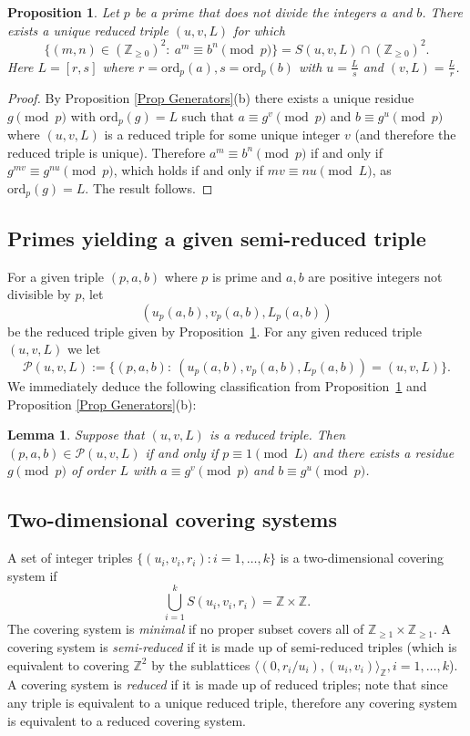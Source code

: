 \documentclass[12pt, a4paper,  reqno, english]{amsart}%
\numberwithin{equation}{section}
\newcommand{\Z}{\mathbb{Z}}
\newtheorem{proposition}{Proposition}
\newtheorem{lemma}{Lemma}
\theoremstyle{definition}
\renewcommand{\geq}{\geqslant}
\begin{document}
 \begin{proposition} \label{Prop 1} Let $p$ be a prime that does not divide the integers $a$ and $b$.
There exists a unique reduced triple $(u,v,L)$ for which 
\[
  \{ (m,n)\in  (\mathbb Z_{\ge0})^2:\ a^m\equiv b^n \pmod p\} = S(u,v,L)\cap (\mathbb Z_{\ge0})^2.
  \]
Here $L=[r,s]$ where   $r=\text{ord}_p(a), s=\text{ord}_p(b)$  with  $u=\frac Ls$ and $(v,L)=\frac Lr$.
\end{proposition}  

\begin{proof} By Proposition \ref{Prop Generators}(b) there exists a unique residue $g\pmod p$ with $\text{ord}_p(g)=L$  such that $a\equiv g^{v} \pmod p$ and $b\equiv g^{u} \pmod p$ where $(u,v,L)$ is a    reduced triple for some unique integer $v$ (and therefore the reduced triple is unique).  Therefore $a^m\equiv b^n \pmod p$ if and only if $g^{mv}\equiv g^{nu} \pmod p$, which holds if and only if
$mv\equiv nu \pmod L$, as $\text{ord}_p(g)=L$.  The result follows.
\end{proof}
 

 
 
   
 
  \subsection{Primes yielding a given semi-reduced triple}
For a given triple $(p,a,b)$ where $p$ is prime and $a, b$ are positive integers not divisible by $p$, let
$$
(u_p(a,b), v_p(a,b), L_p(a,b))
$$ 
be the reduced triple given by Proposition~\ref{Prop 1}. 
For any given reduced triple $(u,v,L)$ we let 
\[
\mathcal P(u,v,L):=\bigg\{ (p,a,b) :\ (u_p(a,b), v_p(a,b), L_p(a,b))= (u,v,L)\bigg\}.
\]
We immediately deduce the following classification from Proposition~\ref{Prop 1} and Proposition \ref{Prop Generators}(b):

  \begin{lemma} \label{lem: create} Suppose that $(u,v,L)$ is a reduced triple. Then
 $(p,a,b)\in \mathcal P(u,v,L)$ if and only if $p\equiv 1 \pmod L$ and there exists a residue $g \pmod p$ of order $L$
 with  $a\equiv g^v \pmod p$ and $b\equiv g^u \pmod p$.
\end{lemma}
 


\subsection{Two-dimensional covering systems}
 A set of  integer triples $\{ (u_i,v_i,r_i): i=1,\dots,k\}$ is a  two-dimensional covering system if
 \[
 \bigcup_{i=1}^k S(u_i,v_i,r_i) = \mathbb Z \times \mathbb Z.
 \]
The covering system is \emph{minimal} if no proper subset covers all of  $ \mathbb Z_{\geq 1}\times \mathbb Z_{\geq 1}$. A covering system is \emph{semi-reduced} if it is made up of semi-reduced triples   (which is equivalent to covering $\Z^2$ by the sublattices 
$\langle  (0,r_i/u_i), (u_i,v_i)\rangle_{\Z}, i=1,\dots,k$).
A covering system is \emph{reduced} if it is made up of reduced triples; note that since any triple is equivalent to a unique reduced triple, therefore any covering system is equivalent to a reduced covering system.
\end{document}
